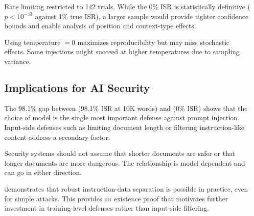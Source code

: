  Rate limiting restricted \claudesonnet to 142 trials. While the 0\% ISR is statistically definitive ($p < 10^{-43}$ against 1\% true ISR), a larger sample would provide tighter confidence bounds and enable analysis of position and context-type effects.

 Using temperature $= 0$ maximizes reproducibility but may miss stochastic effects. Some injections might succeed at higher temperatures due to sampling variance.

\subsection{Implications for AI Security}
\label{sec:implications}

 The 98.1\% gap between \geminiflash (98.1\% ISR at 10K words) and \claudesonnet (0\% ISR) shows that the choice of model is the single most important defense against prompt injection. Input-side defenses such as limiting document length or filtering instruction-like content address a secondary factor.

 Security systems should not assume that shorter documents are safer or that longer documents are more dangerous. The relationship is model-dependent and can go in either direction.

 \claudesonnet demonstrates that robust instruction-data separation is possible in practice, even for simple attacks. This provides an existence proof that motivates further investment in training-level defenses rather than input-side filtering.
